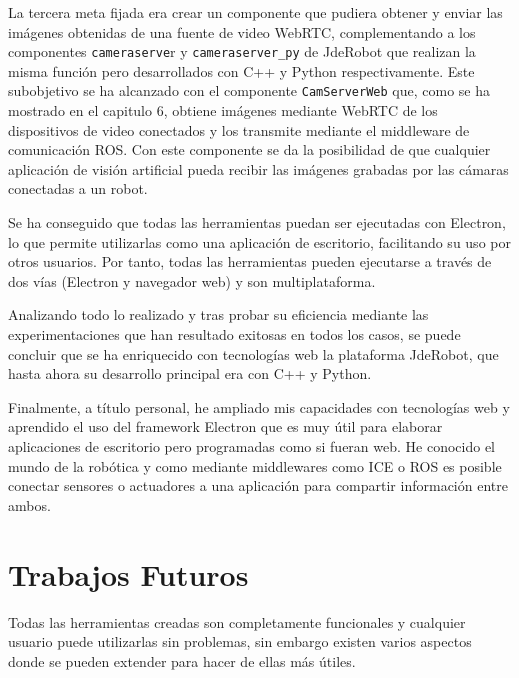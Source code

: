 La tercera meta fijada era crear un componente que pudiera obtener y enviar las imágenes obtenidas de una fuente de video WebRTC, complementando a los componentes \texttt{cameraserve}r y \texttt{cameraserver\_py} de JdeRobot que realizan la misma función pero desarrollados con C++ y Python respectivamente. Este subobjetivo se ha alcanzado con el componente \texttt{CamServerWeb} que, como se ha mostrado en el capitulo 6, obtiene imágenes mediante WebRTC de los dispositivos de video conectados y los transmite mediante el middleware de comunicación ROS. Con este componente se da la posibilidad de que cualquier aplicación de visión artificial pueda recibir las imágenes grabadas por las cámaras conectadas a un robot.

Se ha conseguido que todas las herramientas puedan ser ejecutadas con Electron, lo que permite utilizarlas como una aplicación de escritorio, facilitando su uso por otros usuarios. Por tanto, todas las herramientas pueden ejecutarse a través de dos vías (Electron y navegador web) y son multiplataforma.

Analizando todo lo realizado y tras probar su eficiencia mediante las experimentaciones que han resultado exitosas en todos los casos, se puede concluir que se ha enriquecido con tecnologías web la plataforma JdeRobot, que hasta ahora su desarrollo principal era con C++ y Python.


Finalmente, a título personal, he ampliado mis capacidades con tecnologías web y aprendido el uso del framework Electron que es muy útil para elaborar aplicaciones de escritorio pero programadas como si fueran web. He conocido el mundo de la robótica y como mediante middlewares como ICE o ROS es posible conectar sensores o actuadores a una aplicación para compartir información entre ambos.

\section{Trabajos Futuros}
Todas las herramientas creadas son completamente funcionales y cualquier usuario puede utilizarlas sin problemas, sin embargo existen varios aspectos donde se pueden extender para hacer de ellas más útiles.

